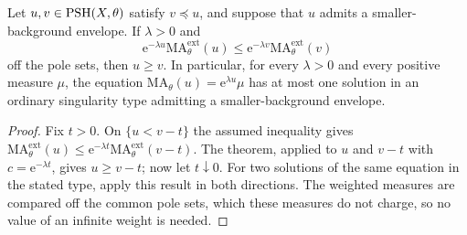 \begin{corollary}\label{cor:singular-exponential-order}
Let $u,v\in\mathrm{PSH}(X,\theta)$ satisfy $v\preceq u$, and suppose that $u$ admits a smaller-background envelope. If $\lambda>0$ and
\[
 \mathrm{e}^{-\lambda u}\mathrm{MA}^{\mathrm{ext}}_\theta(u)
 \leq \mathrm{e}^{-\lambda v}\mathrm{MA}^{\mathrm{ext}}_\theta(v)
\]
off the pole sets, then $u\geq v$. In particular, for every $\lambda>0$ and every positive measure $\mu$, the equation $\mathrm{MA}_\theta(u)=\mathrm{e}^{\lambda u}\mu$ has at most one solution in an ordinary singularity type admitting a smaller-background envelope.
\end{corollary}
\begin{proof}
Fix $t>0$. On $\{u<v-t\}$ the assumed inequality gives
$\mathrm{MA}_\theta^{\mathrm{ext}}(u)\leq \mathrm{e}^{-\lambda t}\mathrm{MA}_\theta^{\mathrm{ext}}(v-t)$.
The theorem, applied to $u$ and $v-t$ with $c=\mathrm{e}^{-\lambda t}$, gives $u\geq v-t$; now let $t\downarrow0$. For two solutions of the same equation in the stated type, apply this result in both directions. The weighted measures are compared off the common pole sets, which these measures do not charge, so no value of an infinite weight is needed.
\end{proof}
